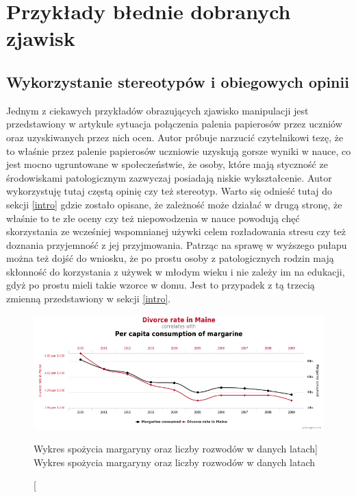\documentclass{classrep}
\begin{document}
    \section{Przykłady błednie dobranych zjawisk}
    \label{wrong_examples} {

        \subsection{Wykorzystanie stereotypów i obiegowych opinii}
        \label{wrong_examples:stereotypes} {
            Jednym z ciekawych przykładów obrazujących zjawisko manipulacji jest
            przedstawiony w artykule \cite{medium_article} sytuacja połączenia palenia
            papierosów przez uczniów oraz uzyskiwanych przez nich ocen. Autor próbuje
            narzucić czytelnikowi tezę, że to właśnie przez palenie papierosów uczniowie
            uzyskują gorsze wyniki w nauce, co jest mocno ugruntowane w społeczeństwie, że
            osoby, które mają styczność ze środowiskami patologicznym zazwyczaj posiadają
            niskie wykształcenie. Autor wykorzystuję tutaj częstą opinię czy też
            stereotyp.
            Warto się odnieść tutaj do sekcji \ref{intro} gdzie zostało opisane, że
            zależność może działać w drugą stronę, że właśnie to te złe oceny czy też
            niepowodzenia w nauce powodują chęć skorzystania ze wcześniej wspomnianej
            używki celem rozładowania stresu czy też doznania przyjemność z jej
            przyjmowania. Patrząc na sprawę w wyższego pułapu można też dojść do
            wniosku, że po prostu osoby z patologicznych rodzin mają skłonność do
            korzystania z używek w młodym wieku i nie zależy im na edukacji, gdyż
            po prostu mieli takie wzorce w domu. Jest to przypadek z tą trzecią zmienną
            przedstawiony w sekcji \ref{intro}.
        }

        \begin{figure}[!htbp]
            \centering
            \includegraphics[width=\textwidth,keepaspectratio]{img/margarine_divorces.png}
            \caption
            [Wykres spożycia margaryny oraz liczby rozwodów w danych latach]
            {Wykres spożycia margaryny oraz liczby rozwodów w danych latach}
            \label{margarine_divorces}
        \end{figure}
        \FloatBarrier
    }
\end{document}
